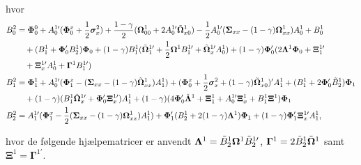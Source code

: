 \documentclass[
  a4paper,
  oneside]{memoir}
\begin{document}
hvor
\begin{align*}
B_0^2&=\bm{\Phi}_0^0 + A_0^{1\prime} (\bm{\Phi}_0^x + \frac{1}{2}\bm{\sigma}_x^2) + \frac{1-\gamma}{2} (\bm{\Omega}_{00}^1 + 2A_0^{1\prime}\Tilde{\bm{\Omega}}_{x0}^1)- \frac{1}{2} A_0^{1\prime} (\bm{\Sigma}_{xx} - (1-\gamma) \bm{\Omega}_{xx}^1) A_0^1 + B_0^1 \\
&\quad + (B_1^1 + \bm{\Phi}_0' B_2^1)\bm{\Phi}_0 + (1-\gamma) B_1^1 (\Tilde{\bm{\Omega}}_1^{1\prime} + \frac{1}{2} \bm{\Omega}^1 B_1^{1\prime} + \Tilde{\bm{\Omega}}_x^{1\prime} A_0^1)+ (1-\gamma) \bm{\Phi}_0' (2\bm{\Lambda}^1 \bm{\Phi}_0 + \bm{\Xi}_1^{1\prime}\\
&\quad + \bm{\Xi}_x^{1\prime} A_0^1 + \bm{\Gamma}^1 B_1^{1\prime})\\
B_1^2&=\bm{\Phi}_1^1 + A_0^{1\prime} (\bm{\Phi}_1^x - (\bm{\Sigma}_{xx} - (1-\gamma) \Tilde{\bm{\Omega}}_{xx}^{1}) A_1^1) + ( \bm{\Phi}_0^x + \frac{1}{2} \bm{\sigma}_x^2 + (1-\gamma) \Tilde{\bm{\Omega}}_{x0}^{1})' A_1^1+ (B_1^1 + 2\bm{\Phi}_0' \Tilde{B}_2^1) \bm{\Phi}_1\\
&\quad + (1-\gamma) (B_1^1 \Tilde{\bm{\Omega}}_{x}^{1\prime} + \bm{\Phi}_0' \bm{\Xi}_x^{1\prime}) A_1^1 + (1-\gamma) (4 \bm{\Phi}_0' \Tilde{\bm{\Lambda}}^1 + \bm{\Xi}_1^1 + A_0^{1\prime} \bm{\Xi}_x^1 + B_1^1 \bm{\Xi}^1) \bm{\Phi}_1\\
B_2^2&= A_1^{1\prime} (\bm{\Phi}_1^x - \frac{1}{2} (\bm{\Sigma}_{xx} - (1-\gamma)\bm{\Omega}_{xx}^1) A_1^1) + \bm{\Phi}_1' (B_2^1 + 2(1-\gamma) \bm{\Lambda}^1) \bm{\Phi}_1 + (1-\gamma)\bm{\Phi}_1' \bm{\Xi}_x^{1\prime} A_1^1,
\end{align*}

hvor de følgende hjælpematricer er anvendt \(\bm{\Lambda}^1=\Tilde{B}_2^{1}\bm{\Omega}^1 \Tilde{B}_2^{1\prime}\), \(\bm{\Gamma}^1=2\Tilde{B}_2^{1}\Tilde{\bm{\Omega}}^1\) samt \(\bm{\Xi}^1=\bm{\Gamma}^{1\prime}\).
\end{document}
